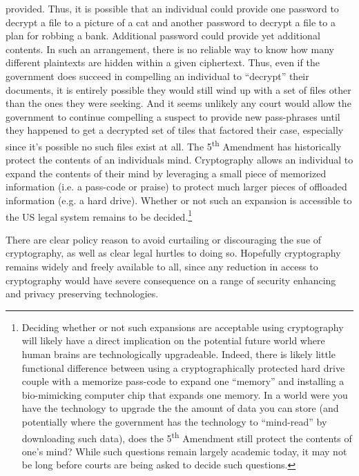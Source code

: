 \begin{packed_desc}
  provided. Thus, it is possible that an individual could provide one
  password to decrypt a file to a picture of a cat and another
  password to decrypt a file to a plan for robbing a bank. Additional
  password could provide yet additional contents. In such an
  arrangement, there is no reliable way to know how many different
  plaintexts are hidden within a given ciphertext. Thus, even if the
  government does succeed in compelling an individual to ``decrypt''
  their documents, it is entirely possible they would still wind up
  with a set of files other than the ones they were seeking. And it
  seems unlikely any court would allow the government to continue
  compelling a suspect to provide new pass-phrases until they happened
  to get a decrypted set of tiles that factored their case, especially
  since it's possible no such files exist at all. The
  5\textsuperscript{th} Amendment has historically protect the
  contents of an individuals mind. Cryptography allows an individual
  to expand the contents of their mind by leveraging a small piece of
  memorized information (i.e. a pass-code or praise) to protect much
  larger pieces of offloaded information (e.g. a hard drive). Whether
  or not such an expansion is accessible to the US legal system
  remains to be decided.\footnote{Deciding whether or not such
    expansions are acceptable using cryptography will likely have a
    direct implication on the potential future world where human
    brains are technologically upgradeable. Indeed, there is likely
    little functional difference between using a cryptographically
    protected hard drive couple with a memorize pass-code to expand
    one ``memory'' and installing a bio-mimicking computer chip that
    expands one memory. In a world were you have the technology to
    upgrade the the amount of data you can store (and potentially
    where the government has the technology to ``mind-read'' by
    downloading such data), does the 5\textsuperscript{th} Amendment
    still protect the contents of one's mind? While such questions
    remain largely academic today, it may not be long before courts
    are being asked to decide such questions.}
\end{packed_desc}

There are clear policy reason to avoid curtailing or discouraging the
sue of cryptography, as well as clear legal hurtles to doing
so. Hopefully cryptography remains widely and freely available to all,
since any reduction in access to cryptography would have severe
consequence on a range of security enhancing and privacy preserving
technologies.

